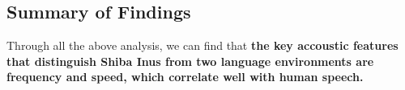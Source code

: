 

\subsection{Summary of Findings}

Through all the above analysis, we can find that \textbf{the key accoustic features that distinguish Shiba Inus from two language environments are frequency and speed, which correlate well with human speech.}





